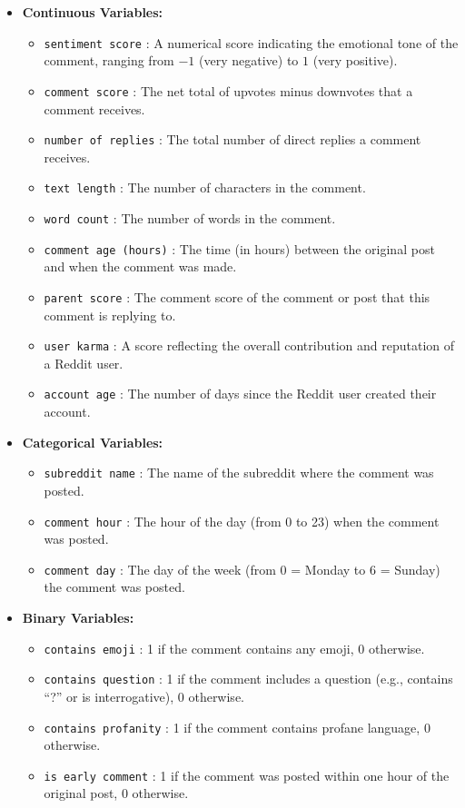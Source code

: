 \documentclass[10pt]{article}
\begin{document}
\begin{itemize}
    \item \textbf{Continuous Variables:}
    \begin{itemize}
        \item \texttt{sentiment score} : A numerical score indicating the emotional tone of the comment, ranging from \(-1\) (very negative) to \(1\) (very positive).
        \item \texttt{comment score} : The net total of upvotes minus downvotes that a comment receives.
        \item \texttt{number of replies} : The total number of direct replies a comment receives.
        \item \texttt{text length} : The number of characters in the comment.
        \item \texttt{word count} : The number of words in the comment.
        \item \texttt{comment age (hours)} : The time (in hours) between the original post and when the comment was made.
        \item \texttt{parent score} : The comment score of the comment or post that this comment is replying to.
        \item \texttt{user karma} : A score reflecting the overall contribution and reputation of a Reddit user.
        \item \texttt{account age} : The number of days since the Reddit user created their account.
    \end{itemize}
    
    \item \textbf{Categorical Variables:}
    \begin{itemize}
        \item \texttt{subreddit name} : The name of the subreddit where the comment was posted.
        \item \texttt{comment hour} : The hour of the day (from 0 to 23) when the comment was posted.
        \item \texttt{comment day} : The day of the week (from 0 = Monday to 6 = Sunday) the comment was posted.
    \end{itemize}
    
    \item \textbf{Binary Variables:}
    \begin{itemize}
        \item \texttt{contains emoji} : 1 if the comment contains any emoji, 0 otherwise.
        \item \texttt{contains question} : 1 if the comment includes a question (e.g., contains “?” or is interrogative), 0 otherwise.
        \item \texttt{contains profanity} : 1 if the comment contains profane language, 0 otherwise.
        \item \texttt{is early comment} : 1 if the comment was posted within one hour of the original post, 0 otherwise.
    \end{itemize}
\end{itemize}
\end{document}
